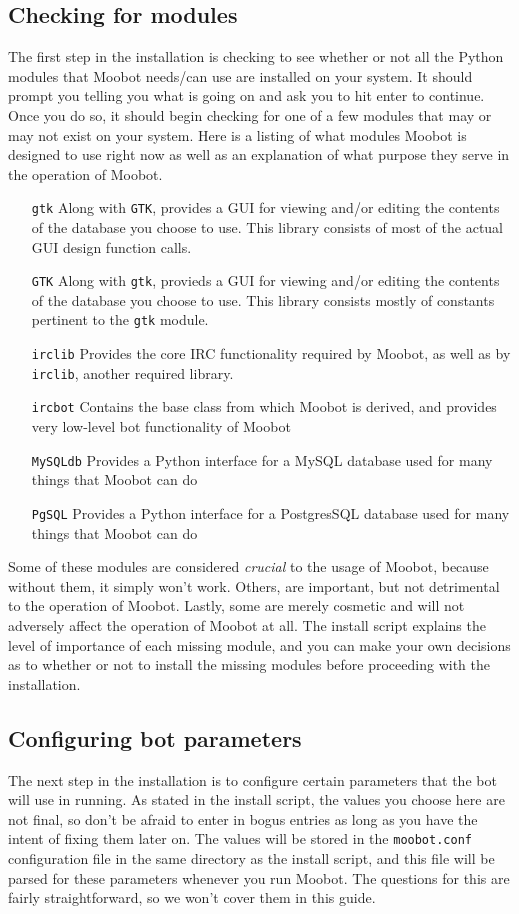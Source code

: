 \documentclass{article}
\begin{document}
\subsection{Checking for modules}
The first step in the installation is checking to see whether or not all the
Python modules that Moobot needs/can use are installed on your system.  It
should prompt you telling you what is going on and ask you to hit enter to
continue.  Once you do so, it should begin checking for one of a few modules
that may or may not exist on your system.  Here is a listing of what modules
Moobot is designed to use right now as well as an explanation of what purpose
they serve in the operation of Moobot.
\begin{itemize}
	\item[\texttt{gtk}]
		Along with \texttt{GTK}, provides a GUI for viewing and/or
		editing the contents of the database you choose to use.  This
		library consists of most of the actual GUI design function
		calls.
	\item[\texttt{GTK}]
		Along with \texttt{gtk}, provieds a GUI for viewing and/or
		editing the contents of the database you choose to use.  This
		library consists mostly of constants pertinent to the
		\texttt{gtk} module.
	\item[\texttt{irclib}]
		Provides the core IRC functionality required by Moobot, as
		well as by \texttt{irclib}, another required library.
	\item[\texttt{ircbot}]
		Contains the base class from which Moobot is derived, and
		provides very low-level bot functionality of Moobot
	\item[\texttt{MySQLdb}]
		Provides a Python interface for a MySQL database used for
		many things that Moobot can do
	\item[\texttt{PgSQL}]
		Provides a Python interface for a PostgresSQL database
		used for many things that Moobot can do
\end{itemize}
Some of these modules are considered \emph{crucial} to the usage of Moobot,
because without them, it simply won't work.  Others, are important, but not
detrimental to the operation of Moobot.  Lastly, some are merely cosmetic and
will not adversely affect the operation of Moobot at all.  The install script
explains the level of importance of each missing module, and you can make your
own decisions as to whether or not to install the missing modules before
proceeding with the installation.
\subsection{Configuring bot parameters}
The next step in the installation is to configure certain parameters that the
bot will use in running.  As stated in the install script, the values you
choose here are not final, so don't be afraid to enter in bogus entries as
long as you have the intent of fixing them later on.  The values will be
stored in the \texttt{moobot.conf} configuration file in the same directory as
the install script, and this file will be parsed for these parameters whenever
you run Moobot.  The questions for this are fairly straightforward, so we
won't cover them in this guide.
\end{document}
